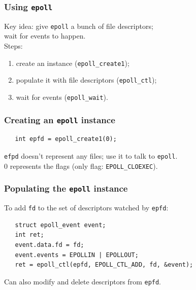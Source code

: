 \documentclass[aspectratio=43]{beamer}
\newenvironment{changemargin}[1]{%
  \begin{list}{}{%
    \setlength{\topsep}{0pt}%
    \setlength{\leftmargin}{#1}%
    \setlength{\rightmargin}{1em}
    \setlength{\listparindent}{\parindent}%
    \setlength{\itemindent}{\parindent}%
    \setlength{\parsep}{\parskip}%
  }%
  \item[]}{\end{list}}
\begin{document}
\begin{frame}
  \frametitle{Using {\tt epoll}}
  \begin{changemargin}{2em}
    Key idea: give {\tt epoll} a bunch of file descriptors;\\
     \hspace*{2em}wait for events to happen.\\[1em]

     Steps:
     \begin{enumerate}
       \item create an instance ({\tt epoll\_create1});
       \item populate it with file descriptors ({\tt epoll\_ctl});
       \item wait for events ({\tt epoll\_wait}).
     \end{enumerate}
  \end{changemargin}
\end{frame}

\begin{frame}[fragile]
  \frametitle{Creating an {\tt epoll} instance}
  \begin{changemargin}{2em}
    \begin{minipage}{.5\textwidth}
    \begin{lstlisting}
   int epfd = epoll_create1(0);
    \end{lstlisting}
    \end{minipage}

    {\tt efpd} doesn't represent any files; use it to talk to {\tt epoll}.\\[1em]

    0 represents the flags (only flag: {\tt EPOLL\_CLOEXEC}).
    
  \end{changemargin}
\end{frame}

\begin{frame}[fragile]
  \frametitle{Populating the {\tt epoll} instance}
  \begin{changemargin}{2em}
    To add {\tt fd} to the set of descriptors watched by {\tt epfd}:
    \begin{lstlisting}
   struct epoll_event event;
   int ret;
   event.data.fd = fd;
   event.events = EPOLLIN | EPOLLOUT;
   ret = epoll_ctl(epfd, EPOLL_CTL_ADD, fd, &event);
    \end{lstlisting}

    Can also modify and delete descriptors from {\tt epfd}.
  \end{changemargin}
\end{frame}
\end{document}
